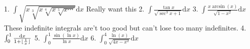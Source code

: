 \documentclass{article}
\DeclarePairedDelimiter{\floor}{\lfloor}{\rfloor}
\newcommand{\dd}{\mathrm{d}}
\begin{document}
\begin{flushleft}
1. $\int \sqrt{x\sqrt[3]{x\sqrt[4]{x\sqrt[5]{x\cdots}}}} \dd x$ Really want this \newline  \newline \newline 
2. $\int \frac{\tan{x}}{\sqrt{\sec^3{x}+1}} \dd x$ \newline  \newline \newline 
3. $\int \frac{x \arcsin (x)}{\sqrt{1-x^2}} \dd x$ These indefinite integrals are't too good but can't lose too many indefinites. \newline  \newline \newline 
4. $\int_0^1 \frac{\dd x}{1+\floor{\frac{1}{x}}}$ \newline  \newline \newline 
5. $\int_0^1 \frac{\sin(\ln{x})}{\ln{x}} \dd x$ \newline  \newline \newline 
6. $\int_0^4 \frac{\ln(x)}{\sqrt{4x-x^2}} \dd x$ \newline  \newline \newline 



\end{flushleft}
\end{document}
